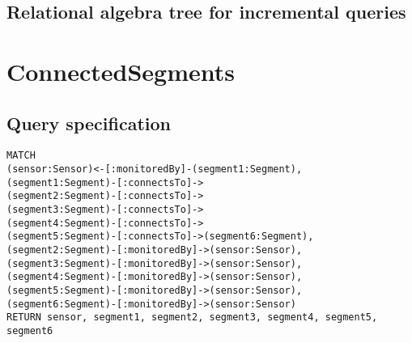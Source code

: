 \subsection*{Relational algebra tree for incremental queries}

\section{ConnectedSegments}

\subsection*{Query specification}

\begin{lstlisting}
MATCH
(sensor:Sensor)<-[:monitoredBy]-(segment1:Segment),
(segment1:Segment)-[:connectsTo]->
(segment2:Segment)-[:connectsTo]->
(segment3:Segment)-[:connectsTo]->
(segment4:Segment)-[:connectsTo]->
(segment5:Segment)-[:connectsTo]->(segment6:Segment),
(segment2:Segment)-[:monitoredBy]->(sensor:Sensor),
(segment3:Segment)-[:monitoredBy]->(sensor:Sensor),
(segment4:Segment)-[:monitoredBy]->(sensor:Sensor),
(segment5:Segment)-[:monitoredBy]->(sensor:Sensor),
(segment6:Segment)-[:monitoredBy]->(sensor:Sensor)
RETURN sensor, segment1, segment2, segment3, segment4, segment5, segment6
\end{lstlisting}

